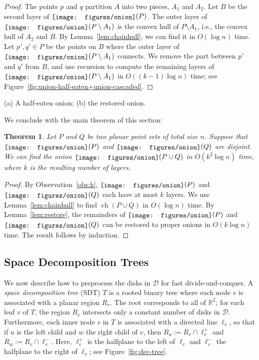 \documentclass{paper}
\newcommand {\R} {\mathbb {R}}
\newcommand {\eqdef}{:=}
\newcommand {\script} [1] {\ensuremath {\mathcal {#1}}}
\newcommand {\D} {\script {D}}
\DeclareMathOperator{\ch}{ch}
\newcommand {\onion} {\raisebox{-0.25ex}{\texttt{[image: figures/onion]}}}
\newtheorem{theorem}{Theorem}[section]
\begin{document}
\begin{proof}
  The points $p$ and $q$ partition  $A$ into two pieces, $A_1$ and $A_2$. 
  Let $B$ be the second layer of $\onion(P)$.
  The outer layer of $\onion (P \setminus A_1)$ is the convex hull of 
  $P \setminus A_1$, 
  i.e., the convex hull of $A_2$ and $B$. 
  By Lemma~\ref {lem:chainhull}, we can find it in $O(\log n)$ time.
  Let $p', q' \in P$ be the points on $B$ where the outer 
  layer of $\onion(P \setminus A_1)$ connects.
  We remove the part between $p'$ and $q'$ from $B$, and
  use recursion to compute the remaining layers of $\onion(P \setminus A_1)$ 
  in $O ((k-1) \log n)$ time; see
  Figure~\ref{fig:union-half-eaten+union-cascaded}.
\end{proof}

{ (a) A half-eaten onion; (b) the restored 
onion.}

\noindent
We conclude with the main theorem of this section:

\begin{theorem}\label{thm:ounion}
  Let $P$ and $Q$ be two planar point sets of total size $n$.
  Suppose that $\onion(P)$ and $\onion(Q)$ are disjoint.
  We can find the onion $\onion (P \cup Q)$ in $O (k^2 \log n)$ 
  time,
  where $k$ is the resulting number of layers.
\end{theorem}

\begin{proof}
  By Observation~\ref{obs:k}, $\onion(P)$ and $\onion(Q)$ each have at most 
  $k$ layers.
  We use Lemma~\ref{lem:chainhull} to find $\ch(P \cup Q)$ 
  in $O(\log n)$ time.
  By Lemma~\ref{lem:restore}, the remainders of 
  $\onion(P)$ and $\onion(Q)$ can be restored to 
  proper onions in $O(k \log n)$ time.
  The result follows by induction.
\end{proof}


\subsection{Space Decomposition Trees}

We now describe how to preprocess the disks in $\D$
for fast divide-and-conquer. 
A \emph{space decomposition tree} (SDT) $T$ 
is a rooted binary tree where each node $v$ is associated with a planar region
$R_v$. The root corresponds to all of $\R^2$; for each leaf 
$v$ of $T$, the region $R_v$ intersects only a constant number of
disks in $\D$.
Furthermore, each inner node $v$ in $T$ is associated with a directed line
$\ell_v$, so that if $u$ is the left child and $w$ the right
child of $v$, then $R_u \eqdef R_v \cap \ell_v^+$ and 
$R_w \eqdef R_v \cap \ell_v^-$. Here, $\ell_v^+$ is the 
halfplane to the left of $\ell_v$ and $\ell_v^-$ the halfplane
to the right of $\ell_v$; see Figure~\ref{fig:dec-tree}.
\end{document}
